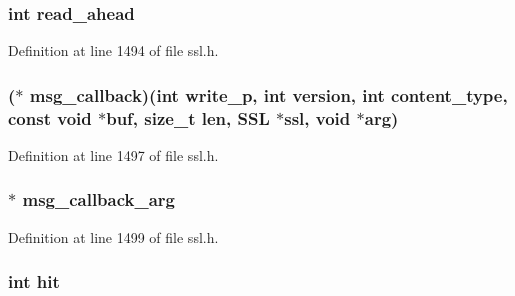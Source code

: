 \subsubsection[{\texorpdfstring{read\+\_\+ahead}{read_ahead}}]{\setlength{\rightskip}{0pt plus 5cm}int read\+\_\+ahead}\hypertarget{structssl__st_abf961fa1992be2cb046dbf46e57a94ff}{}\label{structssl__st_abf961fa1992be2cb046dbf46e57a94ff}


Definition at line 1494 of file ssl.\+h.

\subsubsection[{\texorpdfstring{msg\+\_\+callback}{msg_callback}}]{($\ast$ msg\+\_\+callback)(int write\+\_\+p, int {\bf version}, int content\+\_\+type, const {\bf void} $\ast$buf, size\+\_\+t {\bf len}, {\bf S\+SL} $\ast$ssl, {\bf void} $\ast$arg)}\hypertarget{structssl__st_a1c5cabae73050fccbea43d401aa910c0}{}\label{structssl__st_a1c5cabae73050fccbea43d401aa910c0}


Definition at line 1497 of file ssl.\+h.

\subsubsection[{\texorpdfstring{msg\+\_\+callback\+\_\+arg}{msg_callback_arg}}]{ $\ast$ msg\+\_\+callback\+\_\+arg}\hypertarget{structssl__st_adef70196e5fffd3a53774362719a1e1c}{}\label{structssl__st_adef70196e5fffd3a53774362719a1e1c}


Definition at line 1499 of file ssl.\+h.

\subsubsection[{\texorpdfstring{hit}{hit}}]{\setlength{\rightskip}{0pt plus 5cm}int hit}\hypertarget{structssl__st_a3bc5e521fab9d27f496cbd0e52f0b0be}{}\label{structssl__st_a3bc5e521fab9d27f496cbd0e52f0b0be}


